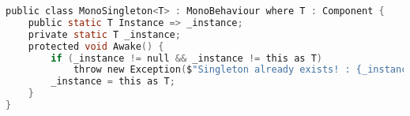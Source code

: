 \begin{lstlisting}[language={C},label=lst:monosingleton,caption={Klasa \texttt{MonoSingleton}}]
public class MonoSingleton<T> : MonoBehaviour where T : Component {
    public static T Instance => _instance;
    private static T _instance;
    protected void Awake() {
        if (_instance != null && _instance != this as T)
            throw new Exception($"Singleton already exists! : {_instance.name}");
        _instance = this as T;
    }
}
\end{lstlisting}